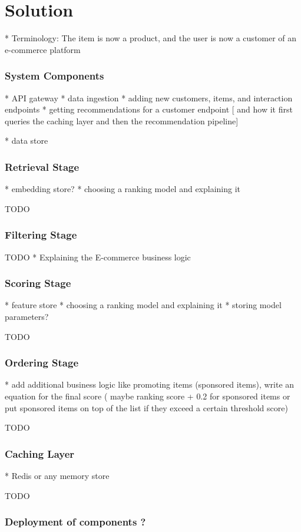 \chapter{Solution}


* Terminology: The item is now a product, and the user is now a customer of an e-commerce platform

\subsection{System Components}


* API gateway
    * data ingestion
    * adding new customers, items, and interaction endpoints 
    * getting recommendations for a customer endpoint [ and how it first queries the caching layer and then the recommendation pipeline]

* data store

\subsection{Retrieval Stage}

* embedding store?
* choosing a ranking model and explaining it

TODO 

\subsection{Filtering Stage}

TODO
* Explaining the E-commerce business logic


\subsection{Scoring Stage}

* feature store 
* choosing a ranking model and explaining it
* storing model parameters?


TODO

\subsection{Ordering Stage}

* add additional business logic like promoting items (sponsored items), write an equation for the final score ( maybe ranking score + 0.2 for sponsored items or put sponsored items on top of the list if they exceed a certain threshold score)

TODO

\subsection{Caching Layer}

* Redis or any memory store

TODO

\subsection{Deployment of components ?}


\minitoc

